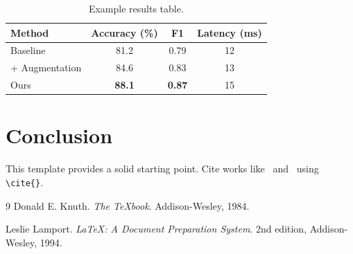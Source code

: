 \documentclass[11pt]{article}
\begin{document}
\begin{table}[htbp]
  \centering
  \caption{Example results table.}
  \label{tab:results}
  \begin{tabular}{lccc}
    \toprule
    Method & Accuracy (\%) & F1 & Latency (ms) \\
    \midrule
    Baseline        & 81.2 & 0.79 & 12 \\
    + Augmentation  & 84.6 & 0.83 & 13 \\
    Ours            & \textbf{88.1} & \textbf{0.87} & 15 \\
    \bottomrule
  \end{tabular}
\end{table}

\section{Conclusion}
This template provides a solid starting point. Cite works like~\cite{knuth1984}
and~\cite{lamport1994} using \verb|\cite{}|.

\begin{thebibliography}{9}
Donald E. Knuth.
\newblock \emph{The TeXbook}.
\newblock Addison-Wesley, 1984.

Leslie Lamport.
\newblock \emph{\LaTeX: A Document Preparation System}.
\newblock 2nd edition, Addison-Wesley, 1994.
\end{thebibliography}
\end{document}
